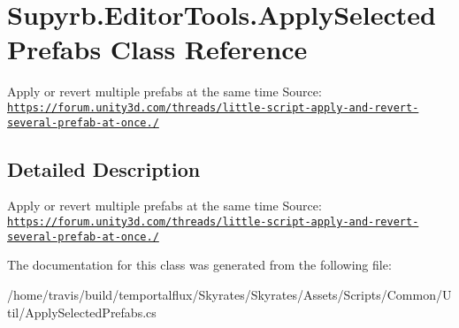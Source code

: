 \hypertarget{class_supyrb_1_1_editor_tools_1_1_apply_selected_prefabs}{\section{Supyrb.\-Editor\-Tools.\-Apply\-Selected\-Prefabs Class Reference}
\label{class_supyrb_1_1_editor_tools_1_1_apply_selected_prefabs}
}


Apply or revert multiple prefabs at the same time Source\-: \href{https://forum.unity3d.com/threads/little-script-apply-and-revert-several-prefab-at-once.295311/}{\tt https\-://forum.\-unity3d.\-com/threads/little-\/script-\/apply-\/and-\/revert-\/several-\/prefab-\/at-\/once./}  




\subsection{Detailed Description}
Apply or revert multiple prefabs at the same time Source\-: \href{https://forum.unity3d.com/threads/little-script-apply-and-revert-several-prefab-at-once.295311/}{\tt https\-://forum.\-unity3d.\-com/threads/little-\/script-\/apply-\/and-\/revert-\/several-\/prefab-\/at-\/once./} 



The documentation for this class was generated from the following file\-:\begin{DoxyCompactItemize}
\item 
/home/travis/build/temportalflux/\-Skyrates/\-Skyrates/\-Assets/\-Scripts/\-Common/\-Util/Apply\-Selected\-Prefabs.\-cs\end{DoxyCompactItemize}
